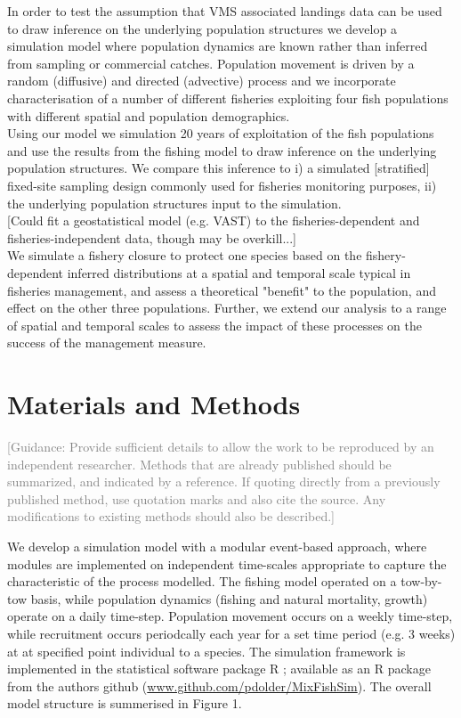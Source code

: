 \documentclass[review]{elsarticle}
\begin{document}
In order to test the assumption that VMS associated landings data can be used
to draw inference on the underlying population structures we develop a
simulation model where population dynamics are known rather than inferred from
sampling or commercial catches. Population movement is driven by a random
(diffusive) and directed (advective) process and we incorporate
characterisation of a number of different fisheries exploiting four fish
populations with different spatial and population demographics.\\

Using our model we simulation 20 years of exploitation of the fish populations
and use the results from the fishing model to draw inference on the underlying
population structures.  We compare this inference to i) a simulated
[stratified] fixed-site sampling design commonly used for fisheries monitoring
purposes, ii) the underlying population structures input to the simulation.\\

[Could fit a geostatistical model (e.g. VAST) to the fisheries-dependent and
fisheries-independent data, though may be overkill...] \\

We simulate a fishery closure to protect one species based on the
fishery-dependent inferred distributions at a spatial and temporal scale
typical in fisheries management, and assess a theoretical "benefit" to the
population, and effect on the other three populations. Further, we extend our
analysis to a range of spatial and temporal scales to assess the impact of
these processes on the success of the management measure. \\

\section{Materials and Methods}

\textcolor{gray}{[Guidance: Provide sufficient details to allow the work to be
reproduced by an independent researcher. Methods that are already published
should be summarized, and indicated by a reference.  If quoting directly from a
previously published method, use quotation marks and also cite the source. Any
modifications to existing methods should also be described.] \\ }

We develop a simulation model with a modular event-based approach, where
modules are implemented on independent time-scales appropriate to capture the
characteristic of the process modelled. The fishing model operated on a
tow-by-tow basis, while population dynamics (fishing and natural mortality,
growth) operate on a daily time-step.  Population movement occurs on a
weekly time-step, while recruitment occurs periodcally each year for a set
time period (e.g. 3 weeks) at at specified point individual to a species. The
simulation framework is implemented in the statistical software package R
\cite{RCoreTeam2017}; available as an R package from the authors github
(\url{www.github.com/pdolder/MixFishSim}). The overall model structure is
summerised in Figure 1.\\
\end{document}
